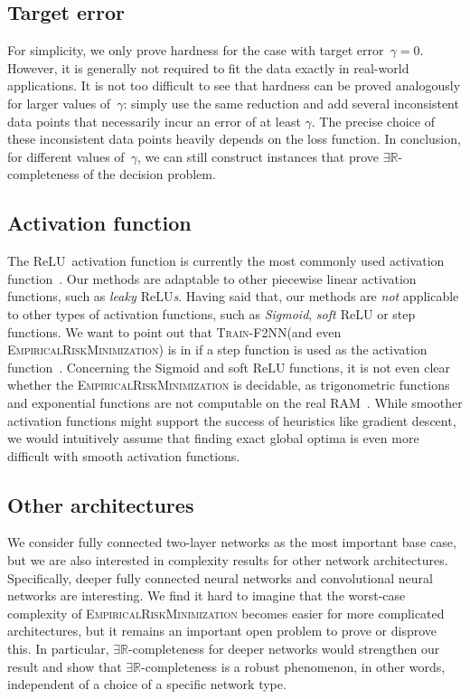 \documentclass[11pt]{article}
\numberwithin{equation}{section}
\theoremstyle{definition}
\theoremstyle{plain}
\newcommand{\R}{\mathbb R}
\newcommand{\ER}{\texorpdfstring{\ensuremath{\exists\R}}{ER}\xspace}
\newcommand{\problemname}[1]{\textnormal{\textsc{#1}}\xspace}
\newcommand{\trainNN}{\problemname{Train-F2NN}}
\newcommand{\ERM}{\problemname{EmpiricalRiskMinimization}}
\newcommand{\fullyconnected}{fully connected\xspace}
\newcommand{\twolayer}{two-layer\xspace}
\newcommand{\ReLU}{\ensuremath{\mathrm{ReLU}}\xspace}
\theoremstyle{plain}
\begin{document}
\subsection{Target error}
For simplicity, we only prove hardness for the case with target error~$\gamma = 0$.
However, it is generally not required to fit the data exactly in real-world applications.
It is not too difficult to see that hardness can be proved analogously for larger values of~$\gamma$: simply use the same reduction and add %
several  %
inconsistent data points that necessarily incur an error of at least $\gamma$.
The precise choice of these inconsistent data points heavily depends on the loss function.
In conclusion, for different values of~$\gamma$, we can still construct instances that prove \ER-completeness of the decision problem.

\subsection{Activation function}
The \ReLU~activation function is currently the most commonly used activation function~\cite{Arora2018_Understanding, Glorot2011_DeepSparse, Goodfellow2016_DeepLearning}.
%
%
%
Our methods are adaptable to other piecewise linear activation functions, such as 
\emph{leaky \ReLU{}s}.
Having said that, our methods are \emph{not} applicable to other types of activation functions, such as \emph{Sigmoid}, \emph{soft \ReLU} or step functions.
We want to point out that \trainNN (and even \ERM) is in \NP{} if a step function is used as the activation function~\cite{Khalife2023_Threshold}.
Concerning the Sigmoid and soft \ReLU %
functions,  %
it is not even clear whether the \ERM is decidable, as trigonometric functions and exponential functions are not computable on the real RAM~\cite{Erickson2022_SmoothingTheGap, Richardson1969_Undecidable}. %
While smoother activation functions might support the success of heuristics like gradient descent, we would intuitively assume that finding exact global optima is even more difficult with smooth activation functions.

\subsection{Other architectures}
We consider \fullyconnected \twolayer networks as the most important base case, but we are also interested in complexity results for other network architectures.
Specifically, deeper \fullyconnected neural networks and convolutional neural networks are interesting.
We find it hard to imagine that the worst-case complexity of \ERM becomes easier for more complicated architectures, but it remains an important open problem to prove or disprove this. In particular, \ER-completeness for deeper networks would strengthen our result and show that \ER-completeness is a robust phenomenon, in other words, independent of a choice of a specific network type.
\end{document}
